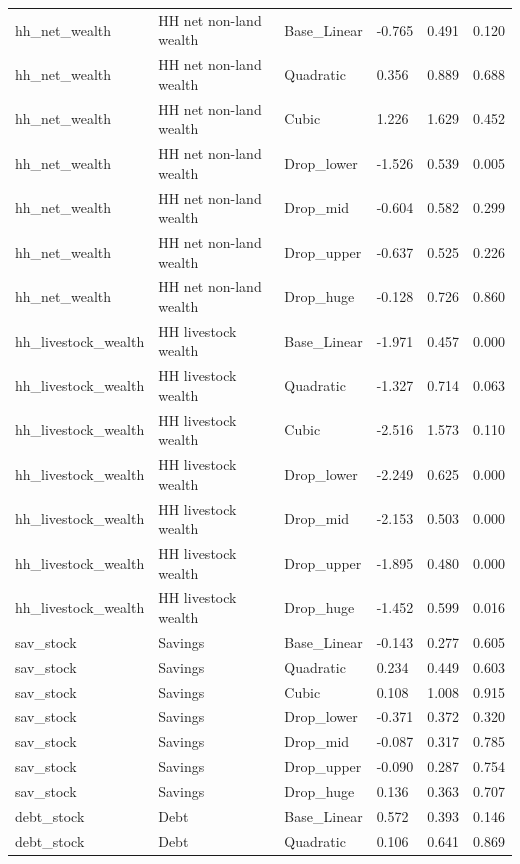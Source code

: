 \begin{tabular}{llllll}
hh\_net\_wealth & HH net non-land wealth & Base\_Linear & -0.765 & 0.491 & 0.120 \\
hh\_net\_wealth & HH net non-land wealth & Quadratic & 0.356 & 0.889 & 0.688 \\
hh\_net\_wealth & HH net non-land wealth & Cubic & 1.226 & 1.629 & 0.452 \\
hh\_net\_wealth & HH net non-land wealth & Drop\_lower & -1.526 & 0.539 & 0.005 \\
hh\_net\_wealth & HH net non-land wealth & Drop\_mid & -0.604 & 0.582 & 0.299 \\
hh\_net\_wealth & HH net non-land wealth & Drop\_upper & -0.637 & 0.525 & 0.226 \\
hh\_net\_wealth & HH net non-land wealth & Drop\_huge & -0.128 & 0.726 & 0.860 \\
hh\_livestock\_wealth & HH livestock wealth & Base\_Linear & -1.971 & 0.457 & 0.000 \\
hh\_livestock\_wealth & HH livestock wealth & Quadratic & -1.327 & 0.714 & 0.063 \\
hh\_livestock\_wealth & HH livestock wealth & Cubic & -2.516 & 1.573 & 0.110 \\
hh\_livestock\_wealth & HH livestock wealth & Drop\_lower & -2.249 & 0.625 & 0.000 \\
hh\_livestock\_wealth & HH livestock wealth & Drop\_mid & -2.153 & 0.503 & 0.000 \\
hh\_livestock\_wealth & HH livestock wealth & Drop\_upper & -1.895 & 0.480 & 0.000 \\
hh\_livestock\_wealth & HH livestock wealth & Drop\_huge & -1.452 & 0.599 & 0.016 \\
sav\_stock & Savings & Base\_Linear & -0.143 & 0.277 & 0.605 \\
sav\_stock & Savings & Quadratic & 0.234 & 0.449 & 0.603 \\
sav\_stock & Savings & Cubic & 0.108 & 1.008 & 0.915 \\
sav\_stock & Savings & Drop\_lower & -0.371 & 0.372 & 0.320 \\
sav\_stock & Savings & Drop\_mid & -0.087 & 0.317 & 0.785 \\
sav\_stock & Savings & Drop\_upper & -0.090 & 0.287 & 0.754 \\
sav\_stock & Savings & Drop\_huge & 0.136 & 0.363 & 0.707 \\
debt\_stock & Debt & Base\_Linear & 0.572 & 0.393 & 0.146 \\
debt\_stock & Debt & Quadratic & 0.106 & 0.641 & 0.869 \\

\end{tabular}
